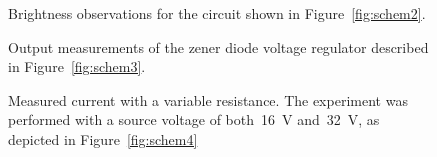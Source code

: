 
\begin{figure}[H]
	\centering
	
	\caption{Brightness observations for the circuit shown in
		Figure~\ref{fig:schem2}.}
	\label{tab:ckt2data}
\end{figure}

\begin{figure}[H]
	\centering
	
	\caption{Output measurements of the zener diode voltage
		regulator described in Figure~\ref{fig:schem3}.}
	\label{tab:ckt3data}
\end{figure}

\begin{figure}[H]
	\centering
	
	\caption{Measured current with a variable resistance.  The experiment was
		performed with a source voltage of both~\SI{16}{\volt}
		and~\SI{32}{\volt}, as depicted in Figure~\ref{fig:schem4}}
	\label{tab:ckt4data}
\end{figure}
